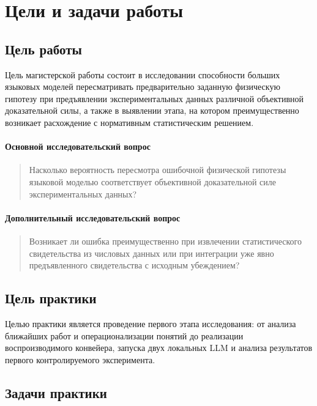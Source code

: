 \documentclass[a4paper,14pt]{extarticle}
\begin{document}
\section{Цели и задачи работы}

\subsection{Цель работы}

Цель магистерской работы состоит в исследовании способности больших языковых моделей пересматривать предварительно заданную физическую гипотезу при предъявлении экспериментальных данных различной объективной доказательной силы, а также в выявлении этапа, на котором преимущественно возникает расхождение с нормативным статистическим решением.

\paragraph{Основной исследовательский вопрос}

\begin{quote}
Насколько вероятность пересмотра ошибочной физической гипотезы языковой моделью соответствует объективной доказательной силе экспериментальных данных?
\end{quote}

\paragraph{Дополнительный исследовательский вопрос}

\begin{quote}
Возникает ли ошибка преимущественно при извлечении статистического свидетельства из числовых данных или при интеграции уже явно предъявленного свидетельства с исходным убеждением?
\end{quote}

\subsection{Цель практики}

Целью практики является проведение первого этапа исследования: от анализа ближайших работ и операционализации понятий до реализации воспроизводимого конвейера, запуска двух локальных LLM и анализа результатов первого контролируемого эксперимента.

\subsection{Задачи практики}
\end{document}
